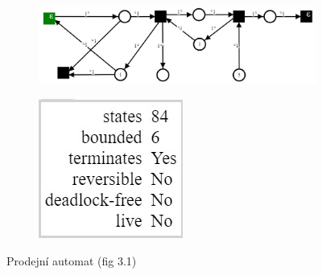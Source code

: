 \documentclass[
  biblatex,
  glossaries,
  printversion
]{kidiplom}
\begin{document}
\clearpage
\begin{figure}[h]
  \centering
  \begin{subfigure}[h]{0.7\linewidth}
    \includegraphics[width=\linewidth]{net_cooking_vending_machine}
  \end{subfigure}
  \begin{subfigure}[h]{0.2\linewidth}
    \includegraphics[width=\linewidth]{net_cooking_vending_machine_analysis}
  \end{subfigure}
  \caption{Prodejní automat (fig 3.1)}
  \label{fig:síť kniha 1}
\end{figure}
\end{document}
